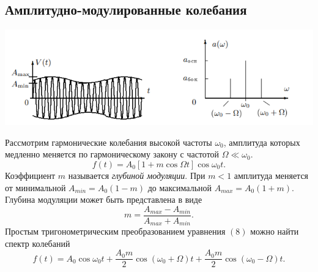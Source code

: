 \documentclass[a4paper,12pt]{article}
\begin{document}
\subsection*{Амплитудно-модулированные колебания}
\begin{center}
\includegraphics[scale=0.9]{4.png}
\end{center}
Рассмотрим гармонические колебания высокой частоты $\omega_0$, амплитуда которых медленно меняется по гармоническому закону с частотой $\Omega \ll \omega_0$.
\begin{equation}
f(t) = A_0 \left[1+m\cos \Omega t\right] \cos \omega_0 t.
\end{equation}
Коэффициент $m$ называется \textit{глубиной модуляции}. При $m < 1$ амплитуда меняется от минимальной $A_{min} = A_0(1-m)$ до максимальной $A_{max} = A_0(1+m)$. Глубина модуляции может быть представлена в виде
\begin{equation}
m = \dfrac{A_{max}-A_{min}}{A_{max}+A_{min}}.
\end{equation}
Простым тригонометрическим преобразованием уравнения $(8)$ можно найти спектр колебаний
\begin{equation}
f(t) = A_0 \cos \omega_0t + \dfrac{A_0m}{2} \cos \left(\omega_0 + \Omega\right)t + \dfrac{A_0m}{2}\cos\left(\omega_0 - \Omega\right)t.
\end{equation}


\end{document}
